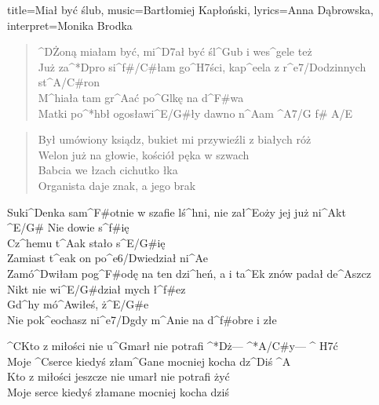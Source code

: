 \newpage
\small
\begin{song}{title={Miał być ślub}, music={Bartłomiej Kapłoński}, lyrics={Anna Dąbrowska}, interpret={Monika Brodka}} 
    \begin{intro}
    \end{intro}
    \begin{verse}
    	^{D}Żoną miałam być, mi^{D7}ał być śl^{G}ub i wes^{g}ele też \\
		Już za^*{D}pro si^{f#/C#}łam go^{H7}ści, kap^{e}ela z r^{e7/D}odzinnych st^{A/C#}ron \\
		M^{h}iała tam gr^{A}ać po^{G}lkę na d^{F#}wa \\
		Matki po^*{h}bł ogosławi^{E/G#}ły dawno n^{A}am ^{A7/G f#  A/E}
	\end{verse}
	\begin{verse}
		Był umówiony ksiądz, bukiet mi przywieźli z białych róż \\
		Welon już na głowie, kościół pęka w szwach \\
		Babcia we łzach cichutko łka \\
		Organista daje znak, a jego brak
	\end{verse}
	\begin{chorus}
		Suki^{D}enka sam^{F#}otnie w szafie lś^{h}ni, nie zał^{E}oży jej już ni^{A}kt \\
	 	^{E/G#}  Nie dowie s^{f#}ię \\
		Cz^{h}emu t^{A}ak stało s^{E/G#}ię \\
		Zamiast t^{e}ak on po^{e6/D}wiedział ni^{A}e \\
		Zamó^{D}wiłam pog^{F#}odę na ten dzi^{h}eń, a i ta^{E}k znów padał de^{A}szcz \\
		Nikt nie wi^{E/G#}dział mych ł^{f#}ez \\
		Gd^{h}y mó^{A}wiłeś, ż^{E/G#}e \\
		Nie pok^{e}ochasz ni^{e7/D}gdy m^{A}nie na d^{f#}obre i złe \\
	\end{chorus}
	\begin{interlude}
		^{C}Kto z miłości nie u^{G}marł nie potrafi ^*{D}ż--- ^*{A/C#}y--- ^{  H7}ć \\
		Moje ^{C}serce kiedyś złam^{G}ane mocniej kocha dz^{D}iś ^{A} \\
		Kto z miłości jeszcze nie umarł nie potrafi żyć \\
		Moje serce kiedyś złamane mocniej kocha dziś
	\end{interlude}
\end{song}

